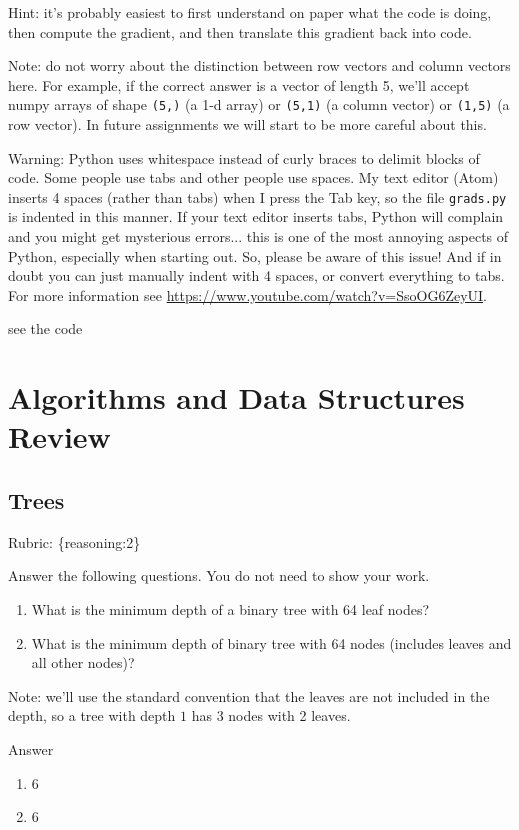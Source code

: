 \documentclass{article}
\def\rubric#1{\gre{Rubric: \{#1\}}}{}
\def\blu#1{{\color{blu}#1}}
\def\gre#1{{\color{gre}#1}}
\def\red#1{{\color{red}#1}}
\begin{document}
Hint: it's probably easiest to first understand on paper what the code is doing, then compute
the gradient, and then translate this gradient back into code.

Note: do not worry about the distinction between row vectors and column vectors here.
For example, if the correct answer is a vector of length 5, we'll accept numpy arrays
of shape \texttt{(5,)} (a 1-d array) or \texttt{(5,1)} (a column vector) or
\texttt{(1,5)} (a row vector). In future assignments we will start to be more careful
about this.

Warning: Python uses whitespace instead of curly braces to delimit blocks of code.
Some people use tabs and other people use spaces. My text editor (Atom) inserts 4 spaces (rather than tabs) when
I press the Tab key, so the file \texttt{grads.py} is indented in this manner. If your text editor inserts tabs,
Python will complain and you might get mysterious errors... this is one of the most annoying aspects
of Python, especially when starting out. So, please be aware of this issue! And if in doubt you can just manually
indent with 4 spaces, or convert everything to tabs. For more information
see \url{https://www.youtube.com/watch?v=SsoOG6ZeyUI}.

\red{
see the code
}

\section{Algorithms and Data Structures Review}

\subsection{Trees}
\rubric{reasoning:2}

\blu{Answer the following questions.} You do not need to show your work.

\begin{enumerate}
\item What is the minimum depth of a binary tree with 64 leaf nodes?
\item What is the minimum depth of binary tree with 64 nodes (includes leaves and all other nodes)?
\end{enumerate}
Note: we'll use the standard convention that the leaves are not included in the depth, so a tree with depth $1$ has 3 nodes with 2 leaves.

\red{
Answer
\begin{enumerate}
\item 6
\item 6
\end{enumerate}
}
\end{document}
